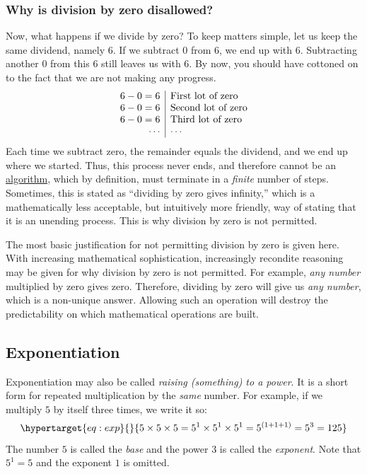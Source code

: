 \documentclass[
  a4paper,
]{article}
\begin{document}
\hypertarget{why-is-division-by-zero-disallowed}{%
\subsubsection{Why is division by zero
disallowed?}\label{why-is-division-by-zero-disallowed}}

Now, what happens if we divide by zero? To keep matters simple, let us
keep the same dividend, namely 6. If we subtract 0 from 6, we end up
with 6. Subtracting another 0 from this 6 still leaves us with 6. By
now, you should have cottoned on to the fact that we are not making any
progress. \[
\begin{array}{r | l}
6 - 0 = 6 & \mbox{First lot of zero}\\
6 - 0 = 6 & \mbox{Second lot of zero}\\
6 - 0 = 6 & \mbox{Third lot of zero}\\
\cdots & \cdots\\
\end{array}
\] Each time we subtract zero, the remainder equals the dividend, and we
end up where we started. Thus, this process never ends, and therefore
cannot be an
\href{https://mathworld.wolfram.com/Algorithm.html}{algorithm}, which by
definition, must terminate in a \emph{finite} number of steps.
Sometimes, this is stated as ``dividing by zero gives infinity,'' which
is a mathematically less acceptable, but intuitively more friendly, way
of stating that it is an unending process. This is why division by zero
is not permitted.

The most basic justification for not permitting division by zero is
given here. With increasing mathematical sophistication, increasingly
recondite reasoning may be given for why division by zero is not
permitted. For example, \emph{any number} multiplied by zero gives zero.
Therefore, dividing by zero will give us \emph{any number}, which is a
non-unique answer. Allowing such an operation will destroy the
predictability on which mathematical operations are built.

\hypertarget{exponentiation}{%
\subsection{Exponentiation}\label{exponentiation}}

Exponentiation may also be called \emph{raising (something) to a power}.
It is a short form for repeated multiplication by the \emph{same}
number. For example, if we multiply \(5\) by itself three times, we
write it so: \begin{equation}\protect\hypertarget{eq:exp}{}{
5\times5\times5 = 5^1\times5^1\times5^1 = 5^{(1+1+1)} = 5^{3} = 125
}\label{eq:exp}\end{equation} The number \(5\) is called the \emph{base}
and the power \(3\) is called the \emph{exponent}. Note that \(5^1 = 5\)
and the exponent \(1\) is omitted.
\end{document}

